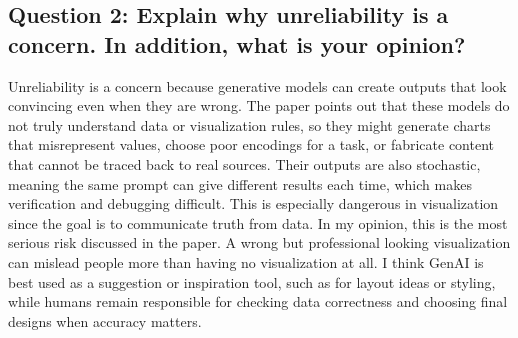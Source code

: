 \documentclass[11pt]{article}
\begin{document}
\subsection*{Question 2: Explain why unreliability is a concern. In addition, what is your opinion?}

Unreliability is a concern because generative models can create outputs that look convincing even when they are wrong. The paper points out that these models do not truly understand data or visualization rules, so they might generate charts that misrepresent values, choose poor encodings for a task, or fabricate content that cannot be traced back to real sources. Their outputs are also stochastic, meaning the same prompt can give different results each time, which makes verification and debugging difficult. This is especially dangerous in visualization since the goal is to communicate truth from data. In my opinion, this is the most serious risk discussed in the paper. A wrong but professional looking visualization can mislead people more than having no visualization at all. I think GenAI is best used as a suggestion or inspiration tool, such as for layout ideas or styling, while humans remain responsible for checking data correctness and choosing final designs when accuracy matters.
\end{document}
